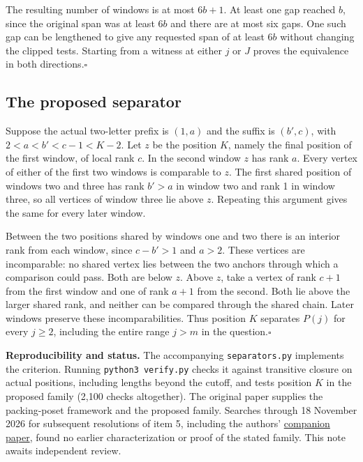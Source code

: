 \documentclass[11pt]{article}
\newcommand{\done}{\hfill\(\square\)}
\begin{document}
The resulting number of windows is at most $6b+1$. At least one gap reached $b$, since the original span was at least $6b$ and there are at most six gaps. One such gap can be lengthened to give any requested span of at least $6b$ without changing the clipped tests. Starting from a witness at either $j$ or $J$ proves the equivalence in both directions.\done

\subsection*{The proposed separator}
Suppose the actual two-letter prefix is $(1,a)$ and the suffix is $(b',c)$, with $2<a<b'<c-1<K-2$. Let $z$ be the position $K$, namely the final position of the first window, of local rank $c$. In the second window $z$ has rank $a$. Every vertex of either of the first two windows is comparable to $z$. The first shared position of windows two and three has rank $b'>a$ in window two and rank 1 in window three, so all vertices of window three lie above $z$. Repeating this argument gives the same for every later window.

Between the two positions shared by windows one and two there is an interior rank from each window, since $c-b'>1$ and $a>2$. These vertices are incomparable: no shared vertex lies between the two anchors through which a comparison could pass. Both are below $z$. Above $z$, take a vertex of rank $c+1$ from the first window and one of rank $a+1$ from the second. Both lie above the larger shared rank, and neither can be compared through the shared chain. Later windows preserve these incomparabilities. Thus position $K$ separates $P(j)$ for every $j\ge2$, including the entire range $j>m$ in the question.\done

\small
\textbf{Reproducibility and status.}
The accompanying \texttt{separators.py} implements the criterion. Running \texttt{python3 verify.py} checks it against transitive closure on actual positions, including lengths beyond the cutoff, and tests position $K$ in the proposed family (2,100 checks altogether). The original paper supplies the packing-poset framework and the proposed family. Searches through 18 November 2026 for subsequent resolutions of item 5, including the authors' \href{https://arxiv.org/abs/2611.12829}{companion paper}, found no earlier characterization or proof of the stated family. This note awaits independent review.
\end{document}
